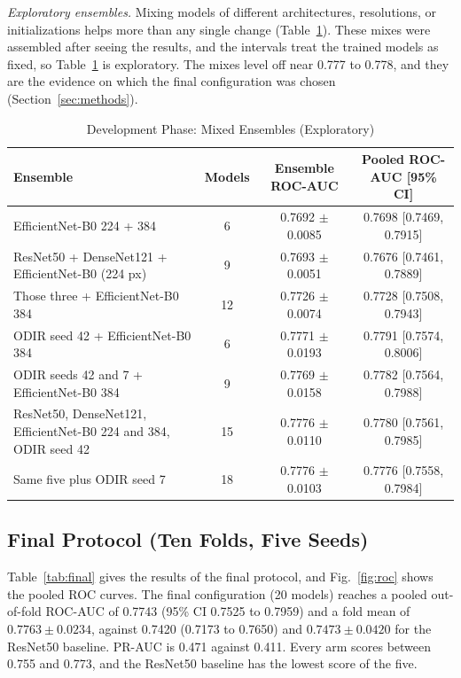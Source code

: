 \textit{Exploratory ensembles.} Mixing models of different architectures, resolutions, or initializations helps more than any single change (Table~\ref{tab:mix}). These mixes were assembled after seeing the results, and the intervals treat the trained models as fixed, so Table~\ref{tab:mix} is exploratory. The mixes level off near 0.777 to 0.778, and they are the evidence on which the final configuration was chosen (Section~\ref{sec:methods}).

\begin{table}[!t]
\caption{Development Phase: Mixed Ensembles (Exploratory)}
\label{tab:mix}
\centering
\footnotesize
\begin{tabular}{lccc}
\toprule
Ensemble & Models & Ensemble ROC-AUC & Pooled ROC-AUC [95\% CI] \\
\midrule
EfficientNet-B0 224 + 384 & 6 & 0.7692 $\pm$ 0.0085 & 0.7698 [0.7469, 0.7915] \\
ResNet50 + DenseNet121 + EfficientNet-B0 (224 px) & 9 & 0.7693 $\pm$ 0.0051 & 0.7676 [0.7461, 0.7889] \\
Those three + EfficientNet-B0 384 & 12 & 0.7726 $\pm$ 0.0074 & 0.7728 [0.7508, 0.7943] \\
ODIR seed 42 + EfficientNet-B0 384 & 6 & 0.7771 $\pm$ 0.0193 & 0.7791 [0.7574, 0.8006] \\
ODIR seeds 42 and 7 + EfficientNet-B0 384 & 9 & 0.7769 $\pm$ 0.0158 & 0.7782 [0.7564, 0.7988] \\
ResNet50, DenseNet121, EfficientNet-B0 224 and 384, ODIR seed 42 & 15 & 0.7776 $\pm$ 0.0110 & 0.7780 [0.7561, 0.7985] \\
Same five plus ODIR seed 7 & 18 & 0.7776 $\pm$ 0.0103 & 0.7776 [0.7558, 0.7984] \\
\bottomrule
\end{tabular}
\end{table}

\subsection{Final Protocol (Ten Folds, Five Seeds)}
Table~\ref{tab:final} gives the results of the final protocol, and Fig.~\ref{fig:roc} shows the pooled ROC curves. The final configuration (20 models) reaches a pooled out-of-fold ROC-AUC of 0.7743 (95\% CI 0.7525 to 0.7959) and a fold mean of $0.7763 \pm 0.0234$, against 0.7420 (0.7173 to 0.7650) and $0.7473 \pm 0.0420$ for the ResNet50 baseline. PR-AUC is 0.471 against 0.411. Every arm scores between 0.755 and 0.773, and the ResNet50 baseline has the lowest score of the five.

